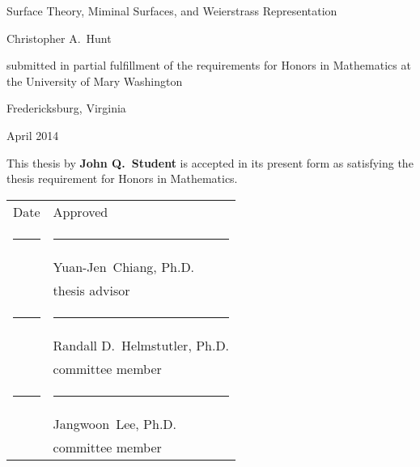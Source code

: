 \documentclass[11pt]{article}
\theoremstyle{definition}
\theoremstyle{remark}
\begin{document}


\protect{\thispagestyle{empty}}

\begin{center}

\LARGE

\phantom{1}

\vspace{1.5in}

\sc Surface Theory, Miminal Surfaces, and Weierstrass Representation \normalfont

\Large

\vspace{1.0in}

Christopher A.\ Hunt

\vfill

submitted in partial fulfillment of the requirements for Honors in Mathematics at the
University of Mary Washington

\vspace{0.5in}

Fredericksburg, Virginia

\vspace{0.5in}

April 2014

\normalsize

\vspace{1.0in}

\end{center}

\pagebreak



\protect{\thispagestyle{empty}}

\phantom{1}

\vspace{0.5in}

\noindent  This thesis by \textbf{John Q.\ Student} is accepted in its present form as satisfying the thesis requirement
for Honors in Mathematics.

\vspace{1.0in}


\begin{tabular}{p{1.0in}l}
\sc Date & \sc Approved \\[.65in]
\rule{0.85in}{0.5pt} & \rule{2.6in}{0.5pt}\\
& Yuan-Jen\ Chiang, Ph.D.\\    %
& thesis advisor\\[.65in]
\rule{0.85in}{0.5pt} & \rule{2.6in}{0.5pt}\\
& Randall D.\ Helmstutler, Ph.D.\\  %
& committee member\\[.65in]
\rule{0.85in}{0.5pt} & \rule{2.6in}{0.5pt}\\
& Jangwoon\ Lee, Ph.D.\\   %
& committee member
\end{tabular}
\end{document}
